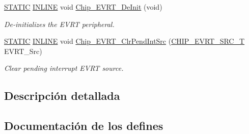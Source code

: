 \begin{DoxyCompactItemize}
\hyperlink{group___l_p_c___types___public___macros_ga10b2d890d871e1489bb02b7e70d9bdfb}{S\+T\+A\+T\+IC} \hyperlink{spifi__18xx__43xx_8h_a2eb6f9e0395b47b8d5e3eeae4fe0c116}{I\+N\+L\+I\+NE} void \hyperlink{group___e_v_r_t__18_x_x__43_x_x_ga10a603696d2fe037b9567a82893a5d41}{Chip\+\_\+\+E\+V\+R\+T\+\_\+\+De\+Init} (void)
\begin{DoxyCompactList}\small\item\em De-\/initializes the E\+V\+RT peripheral. \end{DoxyCompactList}\item 
\hyperlink{group___l_p_c___types___public___macros_ga10b2d890d871e1489bb02b7e70d9bdfb}{S\+T\+A\+T\+IC} \hyperlink{spifi__18xx__43xx_8h_a2eb6f9e0395b47b8d5e3eeae4fe0c116}{I\+N\+L\+I\+NE} void \hyperlink{group___e_v_r_t__18_x_x__43_x_x_ga22d61b16b552be8d515301d9a75ec256}{Chip\+\_\+\+E\+V\+R\+T\+\_\+\+Clr\+Pend\+Int\+Src} (\hyperlink{group___e_v_r_t__18_x_x__43_x_x_gaa43c01b5839b8ef001017d1d1150b16d}{C\+H\+I\+P\+\_\+\+E\+V\+R\+T\+\_\+\+S\+R\+C\+\_\+T} E\+V\+R\+T\+\_\+\+Src)
\begin{DoxyCompactList}\small\item\em Clear pending interrupt E\+V\+RT source. \end{DoxyCompactList}\end{DoxyCompactItemize}


\subsection{Descripción detallada}


\subsection{Documentación de los \textquotesingle{}defines\textquotesingle{}}
